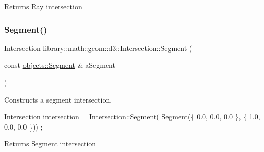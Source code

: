 \begin{DoxyReturn}{Returns}
Ray intersection 
\end{DoxyReturn}
\mbox{\label{classlibrary_1_1math_1_1geom_1_1d3_1_1_intersection_af927ab821d40f12d5dd571316c6262ab}} 
\subsubsection{\texorpdfstring{Segment()}{Segment()}}
{\footnotesize\ttfamily \hyperlink{classlibrary_1_1math_1_1geom_1_1d3_1_1_intersection}{Intersection} library\+::math\+::geom\+::d3\+::\+Intersection\+::\+Segment (\begin{DoxyParamCaption}\item[{const \hyperlink{classlibrary_1_1math_1_1geom_1_1d3_1_1objects_1_1_segment}{objects\+::\+Segment} \&}]{a\+Segment }\end{DoxyParamCaption})\hspace{0.3cm}{\ttfamily [static]}}



Constructs a segment intersection. 


\begin{DoxyCode}
\hyperlink{classlibrary_1_1math_1_1geom_1_1d3_1_1_intersection_afbaef540a058ccc7e58f1be2585304a9}{Intersection} intersection = \hyperlink{classlibrary_1_1math_1_1geom_1_1d3_1_1_intersection_af927ab821d40f12d5dd571316c6262ab}{Intersection::Segment}(
      \hyperlink{classlibrary_1_1math_1_1geom_1_1d3_1_1_intersection_af927ab821d40f12d5dd571316c6262ab}{Segment}(\{ 0.0, 0.0, 0.0 \}, \{ 1.0, 0.0, 0.0 \})) ;
\end{DoxyCode}


\begin{DoxyReturn}{Returns}
Segment intersection 
\end{DoxyReturn}
\mbox{\label{classlibrary_1_1math_1_1geom_1_1d3_1_1_intersection_a7294c6aa40d2353f1f4d7d6019c9dbdc}} 
